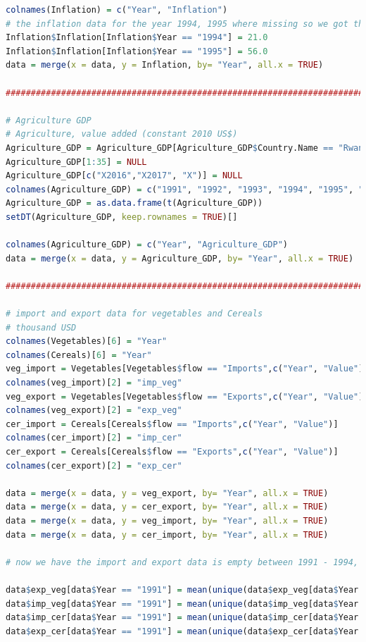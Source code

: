 \documentclass[11pt]{article}
\begin{document}
\begin{lstlisting}[language= R]
colnames(Inflation) = c("Year", "Inflation")
# the inflation data for the year 1994, 1995 where missing so we got them from another source: http://rwanda.opendataforafrica.org/rjirstd/cpi-by-country-statistics?country=Rwanda 
Inflation$Inflation[Inflation$Year == "1994"] = 21.0
Inflation$Inflation[Inflation$Year == "1995"] = 56.0
data = merge(x = data, y = Inflation, by= "Year", all.x = TRUE)

####################################################################################################

# Agriculture GDP
# Agriculture, value added (constant 2010 US$)
Agriculture_GDP = Agriculture_GDP[Agriculture_GDP$Country.Name == "Rwanda",]
Agriculture_GDP[1:35] = NULL
Agriculture_GDP[c("X2016","X2017", "X")] = NULL
colnames(Agriculture_GDP) = c("1991", "1992", "1993", "1994", "1995", "1996", "1997", "1998", "1999", "2000", "2001", "2002", "2003", "2004", "2005", "2006", "2007", "2008", "2009", "2010", "2011", "2012", "2013", "2014", "2015")
Agriculture_GDP = as.data.frame(t(Agriculture_GDP))
setDT(Agriculture_GDP, keep.rownames = TRUE)[]

colnames(Agriculture_GDP) = c("Year", "Agriculture_GDP")
data = merge(x = data, y = Agriculture_GDP, by= "Year", all.x = TRUE)

##################################################################################################

# import and export data for vegetables and Cereals
# thousand USD
colnames(Vegetables)[6] = "Year"
colnames(Cereals)[6] = "Year"
veg_import = Vegetables[Vegetables$flow == "Imports",c("Year", "Value")]
colnames(veg_import)[2] = "imp_veg"
veg_export = Vegetables[Vegetables$flow == "Exports",c("Year", "Value")]
colnames(veg_export)[2] = "exp_veg"
cer_import = Cereals[Cereals$flow == "Imports",c("Year", "Value")]
colnames(cer_import)[2] = "imp_cer"
cer_export = Cereals[Cereals$flow == "Exports",c("Year", "Value")]
colnames(cer_export)[2] = "exp_cer"

data = merge(x = data, y = veg_export, by= "Year", all.x = TRUE)
data = merge(x = data, y = cer_export, by= "Year", all.x = TRUE)
data = merge(x = data, y = veg_import, by= "Year", all.x = TRUE)
data = merge(x = data, y = cer_import, by= "Year", all.x = TRUE)

# now we have the import and export data is empty between 1991 - 1994, we will take the mean of each of the fllowing five years 

data$exp_veg[data$Year == "1991"] = mean(unique(data$exp_veg[data$Year %in% c("1995", "1996", "1997", "1998", "1999")]))
data$imp_veg[data$Year == "1991"] = mean(unique(data$imp_veg[data$Year %in% c("1995", "1996", "1997", "1998", "1999")]))
data$imp_cer[data$Year == "1991"] = mean(unique(data$imp_cer[data$Year %in% c("1995", "1996", "1997", "1998", "1999")]))
data$exp_cer[data$Year == "1991"] = mean(unique(data$exp_cer[data$Year %in% c("1995", "1996", "1997", "1998", "1999")]))


\end{lstlisting}
\end{document}
